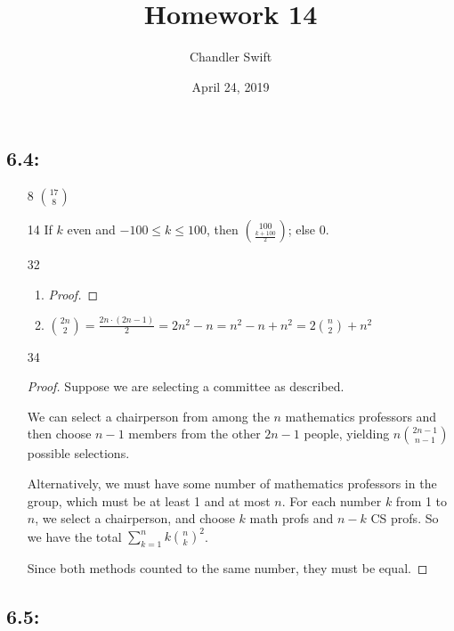 \documentclass{article}
\title{Homework 14}
\author{Chandler Swift}
\date{April 24, 2019}
\begin{document}
\maketitle

\subsection*{6.4:}

\begin{enumerate}
  \item[8] ${17 \choose 8}$
  \item[14]  If $k$ even and $-100 \leq k \leq 100$, then ${100 \choose \frac{k+100}{2}}$; else 0.
  \item[32]
    \begin{enumerate}
      \item \begin{proof}
          
        \end{proof}
      \item ${2n \choose 2} = \frac{2n \cdot (2n-1)}{2} = 2n^2 - n = n^2 - n + n^2 = 2{n \choose 2} + n^2$
    \end{enumerate}
  \item[34] \begin{proof}
      Suppose we are selecting a committee as described.
      
      We can select a chairperson from among the $n$ mathematics professors
      and then choose $n-1$ members from the other $2n-1$ people, yielding
      $n{2n-1 \choose n-1}$ possible selections. 

      Alternatively, we must have some number of mathematics professors in
      the group, which must be at least 1 and at most $n$. For each number $k$
      from 1 to $n$, we select a chairperson, and choose $k$ math profs and $n-k$
      CS profs. So we have the total $\sum_{k=1}^n k{n \choose k}^2$.

      Since both methods counted to the same number, they must be equal.
    \end{proof}
\end{enumerate}

\subsection*{6.5:}
\end{document}

